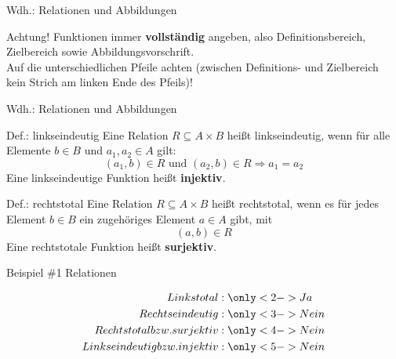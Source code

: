 \begin{frame}{Wdh.: Relationen und Abbildungen}
	\begin{alertblock}{Achtung!}
		Funktionen immer \textbf{vollständig} angeben, also Definitionsbereich, Zielbereich sowie Abbildungsvorschrift. \\
		Auf die unterschiedlichen Pfeile achten (zwischen Definitions- und Zielbereich kein Strich am linken Ende des Pfeils)!
	\end{alertblock}
\end{frame}

\begin{frame}{Wdh.: Relationen und Abbildungen}
	\begin{block}{Def.: linkseindeutig}
	\pause
		Eine Relation $R \subseteq A \times B$ heißt linkseindeutig, wenn für alle Elemente $b \in B$ und $a_1, a_2 \in A$ gilt: $$(a_1,b) \in R \text{ und } (a_2,b) \in R \Rightarrow a_1 = a_2$$
		Eine linkseindeutige Funktion heißt \textbf{injektiv}.
	\end{block}
	\pause
	\begin{block}{Def.: rechtstotal}
	\pause
		Eine Relation $R \subseteq A \times B$ heißt rechtstotal, wenn es für jedes Element $b \in B$ ein zugehöriges Element $a \in A$ gibt, mit $$(a,b) \in R$$
		Eine rechtstotale Funktion heißt \textbf{surjektiv}.
	\end{block}
\end{frame}
\begin{frame}{Beispiel \#1 Relationen}
	\begin{minipage}{0.5\textwidth}
	\end{minipage} \hfill
	\begin{minipage}{0.45\textwidth}
		\begin{align*}
		Linkstotal&: \only<2->{Ja} \\
		Rechtseindeutig&: \only<3->{Nein} \\
		Rechtstotal bzw. surjektiv&: \only<4->{Nein} \\
		Linkseindeutig bzw. injektiv&: \only<5->{Nein} \\
		\end{align*}
	\end{minipage}
\end{frame}
